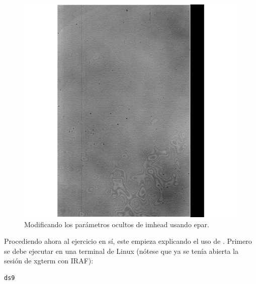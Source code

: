 \documentclass[12pt]{article}
\begin{document}
\begin{figure}[H]
  \centering
   \includegraphics[scale= 0.65]{im02.png}
  \caption{Modificando los parámetros ocultos de imhead usando epar.}
  \label{im02}
\end{figure}

Procediendo ahora al ejercicio en sí, este empieza explicando el uso de . Primero se debe ejecutar en una terminal de Linux (nótese que ya se tenía abierta la sesión de xgterm con IRAF):

\begin{lstlisting}[language=bash]
ds9
\end{lstlisting}
\end{document}
